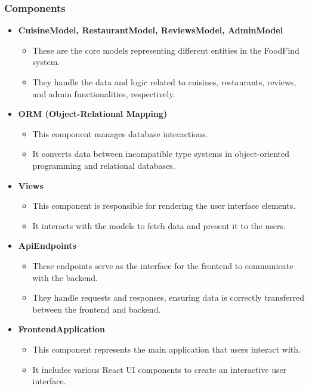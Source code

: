 \documentclass[12pt, a4paper, oneside]{article}
\begin{document}
\subsubsection*{Components}
\begin{itemize}
    \item \textbf{CuisineModel, RestaurantModel, ReviewsModel, AdminModel}
    \begin{itemize}
        \item These are the core models representing different entities in the FoodFind system.
        \item They handle the data and logic related to cuisines, restaurants, reviews, and admin functionalities, respectively.
    \end{itemize}

    \item \textbf{ORM (Object-Relational Mapping)}
    \begin{itemize}
        \item This component manages database interactions.
        \item It converts data between incompatible type systems in object-oriented programming and relational databases.
    \end{itemize}

    \item \textbf{Views}
    \begin{itemize}
        \item This component is responsible for rendering the user interface elements.
        \item It interacts with the models to fetch data and present it to the users.
    \end{itemize}

    \item \textbf{ApiEndpoints}
    \begin{itemize}
        \item These endpoints serve as the interface for the frontend to communicate with the backend.
        \item They handle requests and responses, ensuring data is correctly transferred between the frontend and backend.
    \end{itemize}

    \item \textbf{FrontendApplication}
    \begin{itemize}
        \item This component represents the main application that users interact with.
        \item It includes various React UI components to create an interactive user interface.
    \end{itemize}


\end{itemize}
\end{document}
